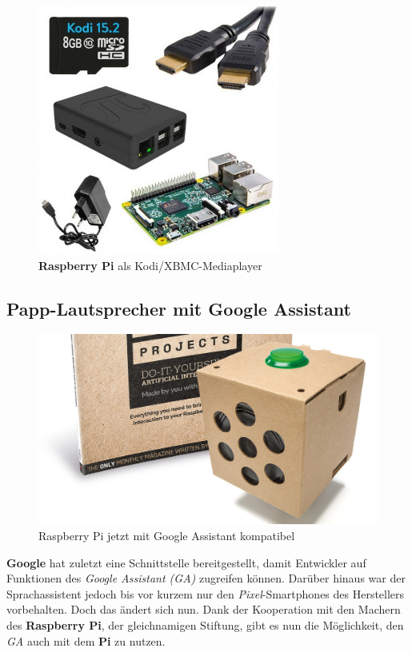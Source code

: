 \documentclass[12pt,a4paper]{article}
\newcommand{\rp}{\textbf{Raspberry Pi}\xspace}
\begin{document}
\begin{figure}[H]
\centering
\includegraphics[scale=.8]{kodi}
\caption{\rp als Kodi/XBMC-Mediaplayer}
\label{fig:kodi}
\end{figure}

\subsection{Papp-Lautsprecher mit Google Assistant}

\begin{figure}[H]
\centering
\includegraphics[scale=.3]{aiy}
\caption{Raspberry Pi jetzt mit Google Assistant kompatibel}
\label{fig:aiy}
\end{figure}

\textbf{Google} hat zuletzt eine Schnittstelle bereitgestellt, damit Entwickler auf Funktionen des \textit{Google Assistant (GA)} zugreifen können. Darüber hinaus war der Sprachassistent jedoch bis vor kurzem nur den \textit{Pixel}-Smartphones des Herstellers vorbehalten. Doch das ändert sich nun. Dank der Kooperation mit den Machern des \rp, der gleichnamigen Stiftung, gibt es nun die Möglichkeit, den \textit{GA} auch mit dem \textbf{Pi} zu nutzen.
\end{document}
